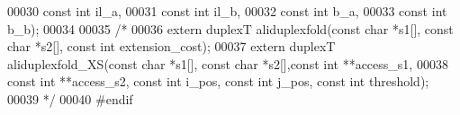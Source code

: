 \begin{DoxyCode}
00030                             \textcolor{keyword}{const} \textcolor{keywordtype}{int} il\_a,
00031                             \textcolor{keyword}{const} \textcolor{keywordtype}{int} il\_b,
00032                             \textcolor{keyword}{const} \textcolor{keywordtype}{int} b\_a,
00033                             \textcolor{keyword}{const} \textcolor{keywordtype}{int} b\_b);
00034 
00035 \textcolor{comment}{/*}
00036 \textcolor{comment}{extern duplexT aliduplexfold(const char *s1[], const char *s2[], const int extension\_cost);}
00037 \textcolor{comment}{extern duplexT aliduplexfold\_XS(const char *s1[], const char *s2[],const int **access\_s1, }
00038 \textcolor{comment}{const int **access\_s2, const int i\_pos, const int j\_pos, const int threshold);}
00039 \textcolor{comment}{*/}
00040 \textcolor{preprocessor}{#endif}
\end{DoxyCode}
